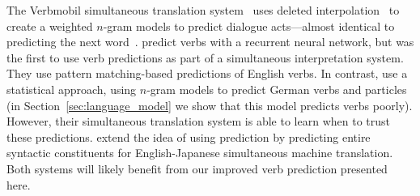   The Verbmobil simultaneous translation
system~\cite{kay1992verbmobil} uses deleted
interpolation~\cite{jelinek1990self} to create a weighted $n$-gram
models to predict dialogue acts---almost identical to predicting the
next word~\cite{reithinger1996predicting}.
 predict verbs with a recurrent
neural network, but  was the first to use verb predictions
as part of a simultaneous interpretation system.  They use pattern
matching-based predictions of English verbs.  In contrast, 
use a statistical approach, using $n$-gram models to predict German verbs and
particles (in Section~\ref{sec:language_model} we show that this model predicts
verbs poorly).  However, their simultaneous translation system is able to learn
when to trust these predictions.  extend the idea of using
prediction by predicting entire syntactic constituents for English-Japanese
simultaneous machine translation.  Both systems will likely benefit from our
improved verb prediction presented here.
